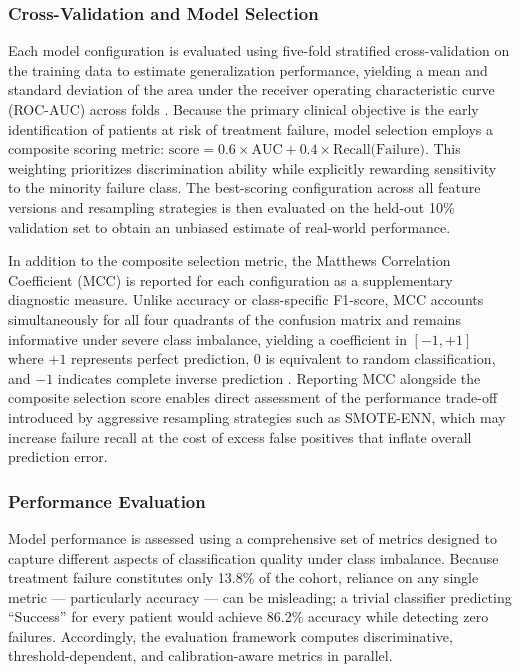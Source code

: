 \documentclass[12pt]{article}
\begin{document}
\subsubsection{Cross-Validation and Model Selection}

Each model configuration is evaluated using five-fold stratified cross-validation on the training data to estimate generalization performance, yielding a mean and standard deviation of the area under the receiver operating characteristic curve (ROC-AUC) across folds \citep{hastie2009elements}. Because the primary clinical objective is the early identification of patients at risk of treatment failure, model selection employs a composite scoring metric: $\text{score} = 0.6 \times \text{AUC} + 0.4 \times \text{Recall(Failure)}$. This weighting prioritizes discrimination ability while explicitly rewarding sensitivity to the minority failure class. The best-scoring configuration across all feature versions and resampling strategies is then evaluated on the held-out 10\% validation set to obtain an unbiased estimate of real-world performance.

In addition to the composite selection metric, the Matthews Correlation Coefficient (MCC) is reported for each configuration as a supplementary diagnostic measure. Unlike accuracy or class-specific F1-score, MCC accounts simultaneously for all four quadrants of the confusion matrix and remains informative under severe class imbalance, yielding a coefficient in $[-1, +1]$ where $+1$ represents perfect prediction, $0$ is equivalent to random classification, and $-1$ indicates complete inverse prediction \citep{chicco2020advantages}. Reporting MCC alongside the composite selection score enables direct assessment of the performance trade-off introduced by aggressive resampling strategies such as SMOTE-ENN, which may increase failure recall at the cost of excess false positives that inflate overall prediction error.

\subsubsection{Performance Evaluation}

Model performance is assessed using a comprehensive set of metrics designed to capture different aspects of classification quality under class imbalance. Because treatment failure constitutes only 13.8\% of the cohort, reliance on any single metric --- particularly accuracy --- can be misleading; a trivial classifier predicting ``Success'' for every patient would achieve 86.2\% accuracy while detecting zero failures. Accordingly, the evaluation framework computes discriminative, threshold-dependent, and calibration-aware metrics in parallel.
\end{document}
